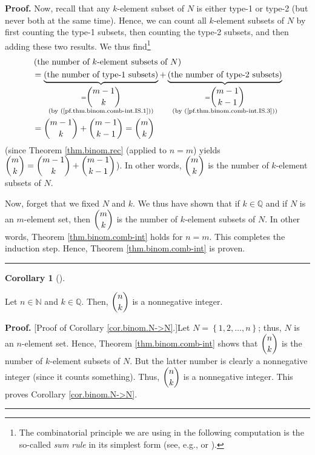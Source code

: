 \documentclass[numbers=enddot,12pt,final,onecolumn,notitlepage]{scrartcl}%
\numberwithin{exer}{subsection}
\theoremstyle{definition}
\newtheorem{coro}[theo]{Corollary}
\newenvironment{corollary}[1][]
{\begin{coro}[#1]\begin{leftbar}}
{\end{leftbar}\end{coro}}
\newenvironment{proof}[1][Proof]{\noindent\textbf{#1.} }{\ \rule{0.5em}{0.5em}}
\begin{document}
\begin{proof}
Now, recall that any $k$-element subset of $N$ is either type-1 or type-2 (but
never both at the same time). Hence, we can count all $k$-element subsets of
$N$ by first counting the type-1 subsets, then counting the type-2 subsets,
and then adding these two results. We thus find\footnote{The combinatorial
principle we are using in the following computation is the so-called
\textit{sum rule} in its simplest form (see, e.g., \cite[1.1]{Loehr-BC} or
\cite[\S 15.2.3]{LeLeMe}).}%
\begin{align*}
&  \left(  \text{the number of }k\text{-element subsets of }N\right) \\
&  =\underbrace{\left(  \text{the number of type-1 subsets}\right)
}_{\substack{=\dbinom{m-1}{k}\\\text{(by (\ref{pf.thm.binom.comb-int.IS.1}))}%
}}+\underbrace{\left(  \text{the number of type-2 subsets}\right)
}_{\substack{=\dbinom{m-1}{k-1}\\\text{(by (\ref{pf.thm.binom.comb-int.IS.3}%
))}}}\\
&  =\dbinom{m-1}{k}+\dbinom{m-1}{k-1}=\dbinom{m}{k}%
\end{align*}
(since Theorem \ref{thm.binom.rec} (applied to $n=m$) yields $\dbinom{m}%
{k}=\dbinom{m-1}{k}+\dbinom{m-1}{k-1}$). In other words, $\dbinom{m}{k}$ is
the number of $k$-element subsets of $N$.

Now, forget that we fixed $N$ and $k$. We thus have shown that if
$k\in\mathbb{Q}$ and if $N$ is an $m$-element set, then $\dbinom{m}{k}$ is the
number of $k$-element subsets of $N$. In other words, Theorem
\ref{thm.binom.comb-int} holds for $n=m$. This completes the induction step.
Hence, Theorem \ref{thm.binom.comb-int} is proven.
\end{proof}

\begin{corollary}
\label{cor.binom.N->N}Let $n\in\mathbb{N}$ and $k\in\mathbb{Q}$. Then,
$\dbinom{n}{k}$ is a nonnegative integer.
\end{corollary}

\begin{proof}
[Proof of Corollary \ref{cor.binom.N->N}.]Let $N=\left\{  1,2,\ldots
,n\right\}  $; thus, $N$ is an $n$-element set. Hence, Theorem
\ref{thm.binom.comb-int} shows that $\dbinom{n}{k}$ is the number of
$k$-element subsets of $N$. But the latter number is clearly a nonnegative
integer (since it counts something). Thus, $\dbinom{n}{k}$ is a nonnegative
integer. This proves Corollary \ref{cor.binom.N->N}.
\end{proof}
\end{document}
